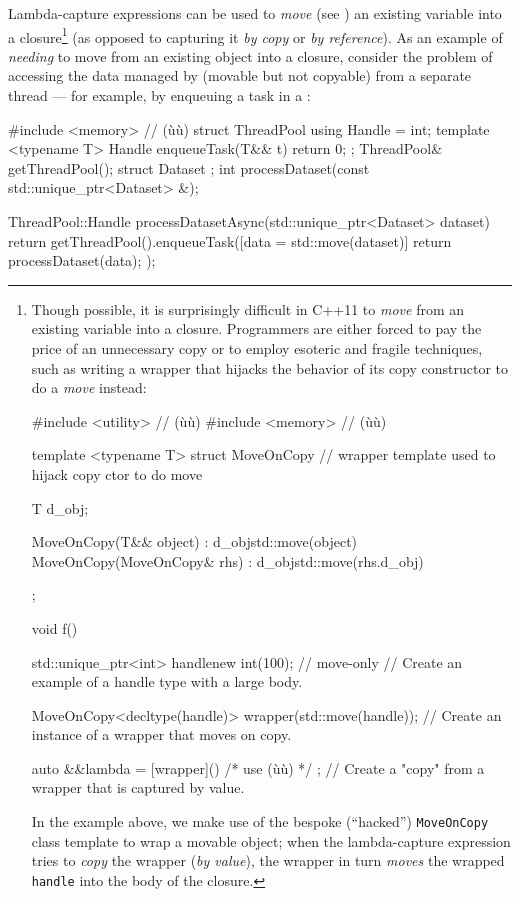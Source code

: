 Lambda-capture expressions can be used to \emph{move} (see
) an existing variable into a
closure{\cprotect\footnote{Though possible, it is surprisingly difficult
in C++11 to \emph{move} from an existing variable into a closure.
Programmers are either forced to pay the price of an unnecessary copy or to employ esoteric and fragile techniques, such as writing a wrapper
that hijacks the behavior of its copy constructor to do a \emph{move}
instead:

\begin{emcppslisting}[style=footcode]
#include <utility>  // (ù{}ù)
#include <memory>   // (ù{}ù)

template <typename T>
struct MoveOnCopy  // wrapper template used to hijack copy ctor to do move
{
    T d_obj;

    MoveOnCopy(T&& object) : d_obj{std::move(object)} { }
    MoveOnCopy(MoveOnCopy& rhs) : d_obj{std::move(rhs.d_obj)} { }
};

void f()
{
    std::unique_ptr<int> handle{new int(100)};  // move-only
        // Create an example of a handle type with a large body.

    MoveOnCopy<decltype(handle)> wrapper(std::move(handle));
        // Create an instance of a wrapper that moves on copy.

    auto &&lambda = [wrapper](){ /* use (ù{}ù) */ };
        // Create a "copy" from a wrapper that is captured by value.
}
\end{emcppslisting}
    
\noindent In the example above, we make use of the bespoke (``hacked'')
\lstinline!MoveOnCopy! class template to wrap a movable object;
when the lambda-capture expression tries to \emph{copy} the wrapper (\emph{by value}),
the wrapper in turn \emph{moves} the wrapped
  \lstinline!handle! into the body of the closure.}} (as opposed to
capturing it \emph{by copy} or \emph{by reference}). As an example of
\emph{needing} to move from an existing object into a closure, consider
the problem of accessing the data managed by
 (movable but not copyable) from a
separate thread --- for example, by enqueuing a task in a :

\begin{emcppshiddenlisting}[emcppsbatch=e1,emcppsstandards={c++14}]
#include <memory>   // (ù{}ù)
struct ThreadPool {
  using Handle = int;
  template <typename T>
  Handle enqueueTask(T&& t) { return 0; }
};
ThreadPool& getThreadPool();
struct Dataset {};
int processDataset(const std::unique_ptr<Dataset> &);
\end{emcppshiddenlisting}
\begin{emcppslisting}[emcppsbatch=e1]
ThreadPool::Handle processDatasetAsync(std::unique_ptr<Dataset> dataset)
{
    return getThreadPool().enqueueTask([data = std::move(dataset)]
    {
        return processDataset(data);
    });
}
\end{emcppslisting}
    
